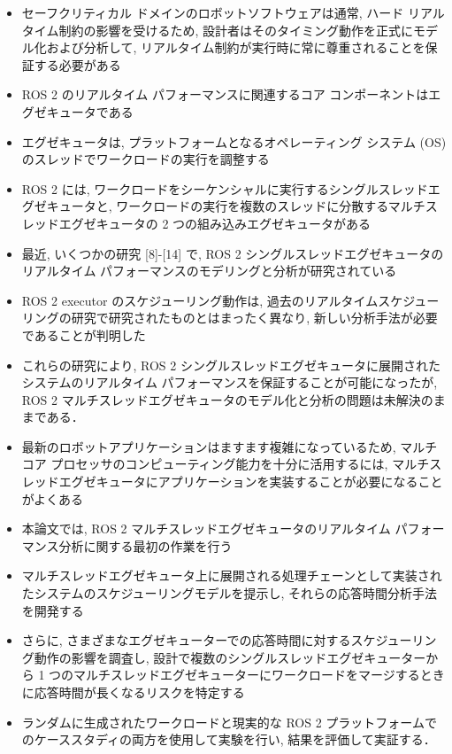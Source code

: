\begin{frame}{}
    \begin{itemize}
        \item セーフクリティカル ドメインのロボットソフトウェアは通常, ハード リアルタイム制約の影響を受けるため, 設計者はそのタイミング動作を正式にモデル化および分析して, リアルタイム制約が実行時に常に尊重されることを保証する必要がある
\item ROS 2 のリアルタイム パフォーマンスに関連するコア コンポーネントはエグゼキュータである
\item エグゼキュータは, プラットフォームとなるオペレーティング システム (OS) のスレッドでワークロードの実行を調整する
\item ROS 2 には, ワークロードをシーケンシャルに実行するシングルスレッドエグゼキュータと, ワークロードの実行を複数のスレッドに分散するマルチスレッドエグゼキュータの 2 つの組み込みエグゼキュータがある
\item 最近, いくつかの研究 [8]-[14] で, ROS 2 シングルスレッドエグゼキュータのリアルタイム パフォーマンスのモデリングと分析が研究されている
\item ROS 2 executor のスケジューリング動作は, 過去のリアルタイムスケジューリングの研究で研究されたものとはまったく異なり, 新しい分析手法が必要であることが判明した
\item これらの研究により, ROS 2 シングルスレッドエグゼキュータに展開されたシステムのリアルタイム パフォーマンスを保証することが可能になったが, ROS 2 マルチスレッドエグゼキュータのモデル化と分析の問題は未解決のままである．
    \end{itemize}
\end{frame}

\begin{frame}{}
    \begin{itemize}
        \item 最新のロボットアプリケーションはますます複雑になっているため, マルチコア プロセッサのコンピューティング能力を十分に活用するには, マルチスレッドエグゼキュータにアプリケーションを実装することが必要になることがよくある
\item 本論文では, ROS 2 マルチスレッドエグゼキュータのリアルタイム パフォーマンス分析に関する最初の作業を行う
\item マルチスレッドエグゼキュータ上に展開される処理チェーンとして実装されたシステムのスケジューリングモデルを提示し, それらの応答時間分析手法を開発する
\item さらに, さまざまなエグゼキューターでの応答時間に対するスケジューリング動作の影響を調査し, 設計で複数のシングルスレッドエグゼキューターから 1 つのマルチスレッドエグゼキューターにワークロードをマージするときに応答時間が長くなるリスクを特定する
\item ランダムに生成されたワークロードと現実的な ROS 2 プラットフォームでのケーススタディの両方を使用して実験を行い, 結果を評価して実証する．
    \end{itemize}
\end{frame}
